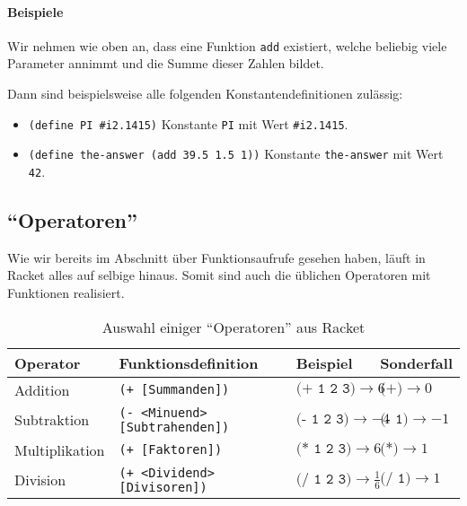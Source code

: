 	\paragraph{Beispiele}
		Wir nehmen wie oben an, dass eine Funktion \texttt{add} existiert, welche beliebig viele Parameter annimmt und die Summe dieser Zahlen bildet.
		
		Dann sind beispielsweise alle folgenden Konstantendefinitionen zulässig:
		\begin{itemize}
			\item \lstinline[language = Racket]|(define PI #i2.1415)| 				  \tabto{7.5cm} Konstante \texttt{PI} mit Wert \texttt{\#i2.1415}.
			\item \lstinline[language = Racket]|(define the-answer (add 39.5 1.5 1))| \tabto{7.5cm} Konstante \texttt{the-answer} mit Wert \texttt{42}.
		\end{itemize}

\subsection{\enquote{Operatoren}}

	Wie wir bereits im Abschnitt über Funktionsaufrufe gesehen haben, läuft in Racket alles auf selbige hinaus. Somit sind auch die üblichen Operatoren mit Funktionen realisiert.

	\begin{table}[H]
		\centering
		\begin{tabular}{l l l l}
			\textbf{Operator} & \textbf{Funktionsdefinition}          & \textbf{Beispiel}                                & \textbf{Sonderfall}                 \\ \hline
			Addition          & \texttt{(+ [Summanden])}              & \( \texttt{(+ 1 2 3)} \rightarrow 6 \)           & \( \texttt{(+)} \rightarrow 0 \)    \\
			Subtraktion       & \texttt{(- <Minuend> [Subtrahenden])} & \( \texttt{(- 1 2 3)} \rightarrow -4 \)          & \( \texttt{(- 1)} \rightarrow -1 \) \\
			Multiplikation    & \texttt{(+ [Faktoren])}               & \( \texttt{(* 1 2 3)} \rightarrow 6 \)           & \( \texttt{(*)} \rightarrow 1 \)    \\
			Division          & \texttt{(+ <Dividend> [Divisoren])}   & \( \texttt{(/ 1 2 3)} \rightarrow \frac{1}{6} \) & \( \texttt{(/ 1)} \rightarrow 1 \)
		\end{tabular}
		\caption{Auswahl einiger \enquote{Operatoren} aus Racket}
	\end{table}

